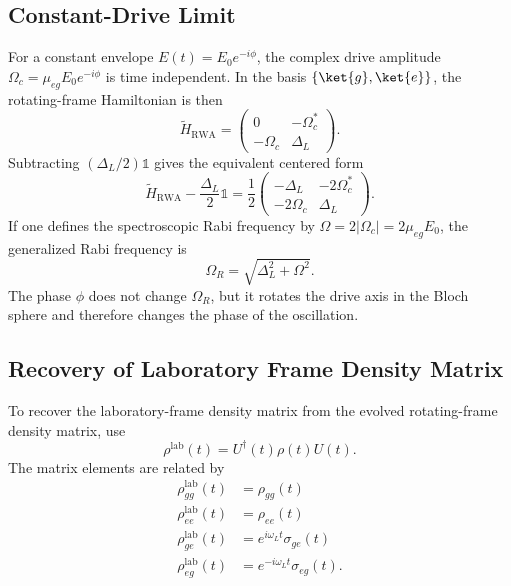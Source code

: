 \subsection{Constant-Drive Limit}
For a constant envelope \(E(t) = E_0 e^{-i\phi}\), the complex drive amplitude \(\Omega_c = \mu_{eg}E_0 e^{-i\phi}\) is time independent.
In the basis \(\{\ket{g}, \ket{e}\}\), the rotating-frame Hamiltonian is then
\begin{equation}
	\tilde{H}_{\mathrm{RWA}} =
	\begin{pmatrix}
		0 & -\Omega_c^* \\
		-\Omega_c & \Delta_L
	\end{pmatrix}.
	\label{eq:RWAHamiltonianMatrix}
\end{equation}
Subtracting \((\Delta_L/2)\mathbb{1}\) gives the equivalent centered form
\begin{equation}
	\tilde{H}_{\mathrm{RWA}} - \frac{\Delta_L}{2}\mathbb{1}
	=
	\frac{1}{2}
	\begin{pmatrix}
		-\Delta_L & -2\Omega_c^* \\
		-2\Omega_c & \Delta_L
	\end{pmatrix}.
\end{equation}
If one defines the spectroscopic Rabi frequency by \(\Omega = 2|\Omega_c| = 2\mu_{eg}E_0\), the generalized Rabi frequency is
\begin{equation}
	\Omega_R = \sqrt{\Delta_L^2 + \Omega^2}.
	\label{eq:RabiFrequency}
\end{equation}
The phase \(\phi\) does not change \(\Omega_R\), but it rotates the drive axis in the Bloch sphere and therefore changes the phase of the oscillation.


\subsection{Recovery of Laboratory Frame Density Matrix}

To recover the laboratory-frame density matrix from the evolved rotating-frame density matrix, use
\begin{equation}
	\rho^{\mathrm{lab}}(t) = U^\dagger(t)\rho(t)U(t).
	\label{eq:RecoverOriginalDensityMatrix}
\end{equation}
The matrix elements are related by
\begin{align}
	\rho_{gg}^{\mathrm{lab}}(t) & = \rho_{gg}(t) \label{eq:RecoveryGG} \\
	\rho_{ee}^{\mathrm{lab}}(t) & = \rho_{ee}(t) \label{eq:RecoveryEE} \\
	\rho_{ge}^{\mathrm{lab}}(t) & = e^{i\omega_{L} t}\sigma_{ge}(t) \label{eq:RecoveryGE} \\
	\rho_{eg}^{\mathrm{lab}}(t) & = e^{-i\omega_{L} t}\sigma_{eg}(t). \label{eq:RecoveryEG}
\end{align}


